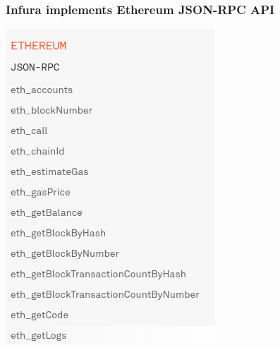 \documentclass[11pt]{beamer}  %
\begin{document}
\begin{frame}\frametitle{Infura implements Ethereum JSON-RPC API}

  \begin{center}
    \includegraphics[scale=0.47,clip=false]{pictures/infura-json-rpc.png}
  \end{center}

\end{frame}
\end{document}
